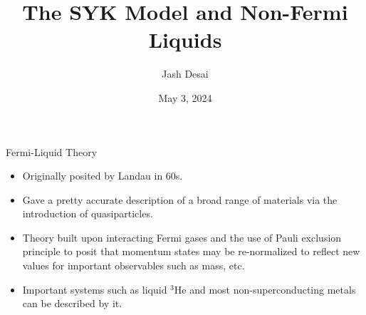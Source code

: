 \documentclass{beamer}
\title{The SYK Model and Non-Fermi Liquids}
\author{Jash Desai}
\institute{Brown University}
\date{May 3, 2024}
\begin{document}
\frame{\titlepage}

\begin{frame}{Fermi-Liquid Theory}

\begin{itemize}
    \item Originally posited by Landau in 60s. 
    \item Gave a pretty accurate description of a broad range of materials via the introduction of quasiparticles. 
    \item Theory built upon interacting Fermi gases and the use of Pauli exclusion principle to posit that momentum states may be re-normalized to reflect new values for important observables such as mass, etc.
    \item Important systems such as liquid $^{3}$He and most non-superconducting metals can be described by it.
\end{itemize}

\end{frame}
\end{document}
